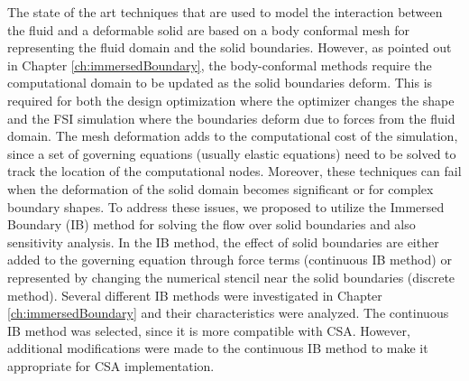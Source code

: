 The state of the art techniques that are used to model the interaction between the fluid and a deformable solid are based on a body conformal mesh for representing the fluid domain and the solid boundaries. However, as pointed out in Chapter \ref{ch:immersedBoundary}, the body-conformal methods require the computational domain to be updated as the solid boundaries deform. This is required for both the design optimization where the optimizer changes the shape and the FSI simulation where the boundaries deform due to forces from the fluid domain. The mesh deformation adds to the computational cost of the simulation, since a set of governing equations (usually elastic equations) need to be solved to track the location of the computational nodes. Moreover, these techniques can fail when the deformation of the solid domain becomes significant or for complex boundary shapes. To address these issues, we proposed to utilize the Immersed Boundary (IB) method for solving the flow over solid boundaries and also sensitivity analysis. In the IB method, the effect of solid boundaries are either added to the governing equation through force terms (continuous IB method) or represented by changing the numerical stencil near the solid boundaries (discrete method). Several different IB methods were investigated in Chapter \ref{ch:immersedBoundary} and their characteristics were analyzed. The continuous IB method was selected, since it is more compatible with CSA. However, additional modifications were made to the continuous IB method to make it appropriate for CSA implementation.

